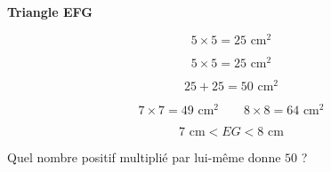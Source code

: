 \documentclass[11pt,a4paper,landscape]{article}
\begin{document}
\hfill
%
\begin{minipage}[t]{0.235\textwidth}

\begin{tcolorbox}[
  colback=SavoirBg,
  colframe=SavoirC!65,
  boxrule=0.8pt,
  arc=1.5mm,
  height=7cm
]

\begin{center}
{\sffamily\bfseries\color{SavoirC}Triangle EFG}
\end{center}

\[
5\times5=25\text{ cm}^2
\]

\[
5\times5=25\text{ cm}^2
\]

\[
25+25=50\text{ cm}^2
\]

\[
7\times7=49\text{ cm}^2
\qquad
8\times8=64\text{ cm}^2
\]

\[
\boxed{7\text{ cm}<EG<8\text{ cm}}
\]

\begin{center}
\small
Quel nombre positif multiplié par lui-même donne \(50\) ?
\end{center}

\end{tcolorbox}

\end{minipage}
\end{document}
